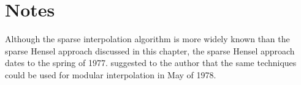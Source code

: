 \section*{Notes}

\small
Although the sparse interpolation algorithm is more widely known than
the sparse Hensel approach discussed in this chapter, the sparse
Hensel approach dates to the spring of 1977.  {\Trager} suggested to
the author that the same techniques could be used for modular
interpolation in May of 1978.

\normalsize
